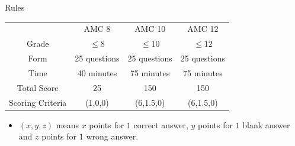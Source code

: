 \documentclass{beamer}
\theoremstyle{definition}
\begin{document}
\begin{frame}{Rules}
    \begin{table}
        \centering
        \begin{tabular}{c|c|c|c}
            \hline
                             & AMC  8       & AMC 10       & AMC 12       \\
            Grade            & $\le 8$      & $\le 10$     & $\le 12$     \\
            Form             & 25 questions & 25 questions & 25 questions \\
            Time             & 40 minutes   & 75 minutes   & 75 minutes   \\
            Total Score      & 25           & 150          & 150          \\
            Scoring Criteria & (1,0,0)      & (6,1.5,0)    & (6,1.5,0)    \\
            \hline
        \end{tabular}
    \end{table}
    \begin{itemize}
        \item  $(x,y,z)$ means $x$ points for $1$ correct answer, $y$ points for $1$ blank answer and $z$ points for $1$ wrong answer.
    \end{itemize}

\end{frame}
\end{document}
